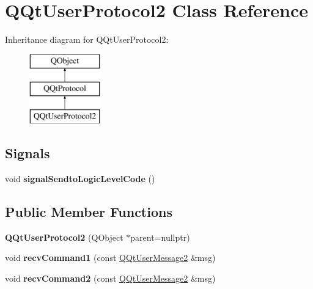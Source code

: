 \hypertarget{class_q_qt_user_protocol2}{}\section{Q\+Qt\+User\+Protocol2 Class Reference}
\label{class_q_qt_user_protocol2}
Inheritance diagram for Q\+Qt\+User\+Protocol2\+:\begin{figure}[H]
\begin{center}
\leavevmode
\includegraphics[height=3.000000cm]{class_q_qt_user_protocol2}
\end{center}
\end{figure}
\subsection*{Signals}
\begin{DoxyCompactItemize}
\item 
\mbox{\label{class_q_qt_user_protocol2_ae79dc30457995911b1990c9bc14d718f}} 
void {\bfseries signal\+Sendto\+Logic\+Level\+Code} ()
\end{DoxyCompactItemize}
\subsection*{Public Member Functions}
\begin{DoxyCompactItemize}
\item 
\mbox{\label{class_q_qt_user_protocol2_a83b791442eec0921ea0ae32c097546aa}} 
{\bfseries Q\+Qt\+User\+Protocol2} (Q\+Object $\ast$parent=nullptr)
\item 
\mbox{\label{class_q_qt_user_protocol2_a72bb78419bc2cc9c085db3accee7cb4a}} 
void {\bfseries recv\+Command1} (const \mbox{\hyperlink{class_q_qt_user_message2}{Q\+Qt\+User\+Message2}} \&msg)
\item 
\mbox{\label{class_q_qt_user_protocol2_a7ee18d78185ff2b1f6470de3d102b50a}} 
void {\bfseries recv\+Command2} (const \mbox{\hyperlink{class_q_qt_user_message2}{Q\+Qt\+User\+Message2}} \&msg)
\end{DoxyCompactItemize}
